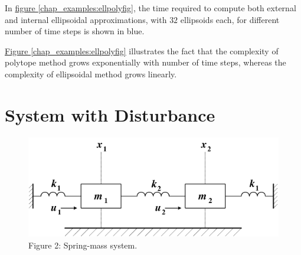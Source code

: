 \documentclass[letterpaper,10pt,english]{sphinxmanual}
\begin{document}
In \hyperref[chap_examples:ellpolyfig]{figure  \ref*{chap_examples:ellpolyfig}}, the time required to compute both external and
internal ellipsoidal approximations, with \(32\) ellipsoids each,
for different number of time steps is shown in blue.

\hyperref[chap_examples:ellpolyfig]{Figure  \ref*{chap_examples:ellpolyfig}} illustrates the fact that the complexity of polytope
method grows exponentially with number of time steps, whereas the
complexity of ellipsoidal method grows linearly.


\section{System with Disturbance}
\label{chap_examples:system-with-disturbance}\begin{figure}[htbp]
\centering
\capstart

\includegraphics[width=0.300\linewidth]{chapter06_section02_springmass.png}
\caption{Figure 2: Spring-mass system.}\label{chap_examples:springmassfig}\end{figure}
\end{document}

